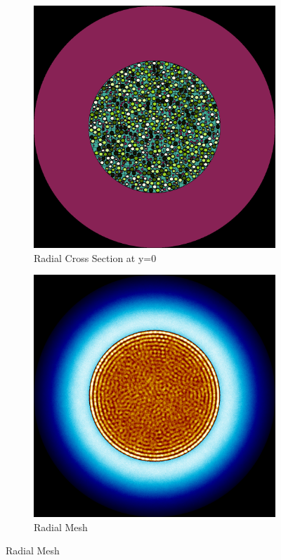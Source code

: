 \begin{figure}[h!]
\centering

\begin{subfigure}{0.45\textwidth}
  \includegraphics[width=0.95\linewidth]{figures/control/control-r}
  \caption{Radial Cross Section at y=0}
  \label{fig:controla}
\end{subfigure}%
%
\begin{subfigure}{0.45\textwidth}
  \includegraphics[width=0.95\linewidth]{figures/control/control-rm}
  \caption{Radial Mesh}
  \label{fig:controlb}
\end{subfigure}


\end{figure}
